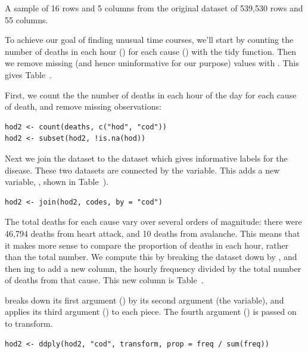 \documentclass[article]{jss}
\begin{document}
\begin{table}
  \centering
  
  \caption{A sample of 16 rows and 5 columns from the original dataset of 539,530 rows and 55 columns.}
  \label{fig:raw}
\end{table}

To achieve our goal of finding unusual time courses, we'll start by counting the number of deaths in each hour () for each cause () with the tidy  function. Then we remove missing (and hence uninformative for our purpose) values with . This gives Table~.

First, we count the the number of deaths in each hour of the day for each cause of death, and remove missing observations:

\begin{Verbatim}
hod2 <- count(deaths, c("hod", "cod"))
hod2 <- subset(hod2, !is.na(hod))
\end{Verbatim}

Next we join the dataset to the  dataset which gives informative labels for the disease. These two datasets are connected by the  variable. This adds a new variable, , shown in Table~).

\begin{Verbatim}
hod2 <- join(hod2, codes, by = "cod")
\end{Verbatim}

The total deaths for each cause vary over several orders of magnitude: there were 46,794 deaths from heart attack, and 10 deaths from avalanche. This means that it makes more sense to compare the proportion of deaths in each hour, rather than the total number. We compute this by breaking the dataset down by , and then ing to add a new  column, the hourly frequency divided by the total number of deaths from that cause. This new column is Table~.

 breaks down its first argument () by its second argument (the  variable), and applies its third argument () to each piece. The fourth argument () is passed on to transform.

\begin{Verbatim}
hod2 <- ddply(hod2, "cod", transform, prop = freq / sum(freq))
\end{Verbatim}
\end{document}
